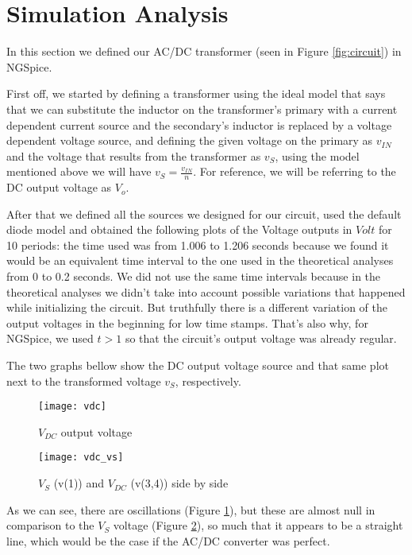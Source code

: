 \section{Simulation Analysis}
\label{sec:simulation}
In this section we defined our AC/DC transformer (seen in Figure \ref{fig:circuit}) in NGSpice.\par
First off, we started by defining a transformer using the ideal model that says that we can substitute the inductor on the transformer's primary with a current dependent current source and the secondary's inductor is replaced by a voltage dependent voltage source, and defining the given voltage on the primary as $v_{IN}$ and the voltage that results from the transformer as $v_S$, using the model mentioned above we will have $v_{S}=\frac{v_{IN}}{n}$.
For reference, we will be referring to the DC output voltage as $V_o$.

After that we defined all the sources we designed for our circuit, used the default diode model and obtained the following plots of the Voltage outputs in $Volt$ for 10 periods: the time used was from 1.006 to 1.206 seconds because we found it would be an equivalent time interval to the one used in the theoretical analyses from 0 to 0.2 seconds. We did not use the same time intervals because in the theoretical analyses we didn't take into account possible variations that happened while initializing the circuit. But truthfully there is a different variation of the output voltages in the beginning for low time stamps. That's also why, for NGSpice, we used $t>1$ so that the circuit's output voltage was already regular.

The two graphs bellow show the DC output voltage source and that same plot next to the transformed voltage $v_S$, respectively.

\FloatBarrier
\begin{figure}[h] 
	\centering
	\texttt{[image: vdc]}
	\caption{$V_{DC}$ output voltage}
	\label{fig:vdc}
\end{figure}
\FloatBarrier

\FloatBarrier
\begin{figure}[h] 
	\centering
	\texttt{[image: vdc\_vs]}
	\caption{$V_{S}$ (v(1)) and $V_{DC}$ (v(3,4)) side by side}
	\label{fig:vdcvin}
\end{figure}
\FloatBarrier

As we can see, there are oscillations (Figure  \ref{fig:vdc}), but these are almost null in comparison to the $V_{S}$ voltage (Figure  \ref{fig:vdcvin}), so much that it appears to be a straight line, which would be the case if the AC/DC converter was perfect.

